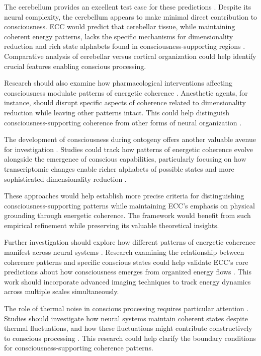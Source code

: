 \begin{refsection}
The cerebellum provides an excellent test case for these predictions \cite{churchland2013touching}. Despite its neural complexity, the cerebellum appears to make minimal direct contribution to consciousness. ECC would predict that cerebellar tissue, while maintaining coherent energy patterns, lacks the specific mechanisms for dimensionality reduction and rich state alphabets found in consciousness-supporting regions \cite{varela2016embodied}. Comparative analysis of cerebellar versus cortical organization could help identify crucial features enabling conscious processing.

Research should also examine how pharmacological interventions affecting consciousness modulate patterns of energetic coherence \cite{chalmers2010character}. Anesthetic agents, for instance, should disrupt specific aspects of coherence related to dimensionality reduction while leaving other patterns intact. This could help distinguish consciousness-supporting coherence from other forms of neural organization \cite{noe2009out}.

The development of consciousness during ontogeny offers another valuable avenue for investigation \cite{goff2019galileo}. Studies could track how patterns of energetic coherence evolve alongside the emergence of conscious capabilities, particularly focusing on how transcriptomic changes enable richer alphabets of possible states and more sophisticated dimensionality reduction \cite{dennett2017bacteria}.

These approaches would help establish more precise criteria for distinguishing consciousness-supporting patterns while maintaining ECC's emphasis on physical grounding through energetic coherence. The framework would benefit from such empirical refinement while preserving its valuable theoretical insights.

Further investigation should explore how different patterns of energetic coherence manifest across neural systems \cite{deacon2011incomplete}. Research examining the relationship between coherence patterns and specific conscious states could help validate ECC's core predictions about how consciousness emerges from organized energy flows \cite{koch2019feeling}. This work should incorporate advanced imaging techniques to track energy dynamics across multiple scales simultaneously.

The role of thermal noise in conscious processing requires particular attention \cite{rovelli2018order}. Studies should investigate how neural systems maintain coherent states despite thermal fluctuations, and how these fluctuations might contribute constructively to conscious processing \cite{penrose2016fashion}. This research could help clarify the boundary conditions for consciousness-supporting coherence patterns.


\end{refsection}
